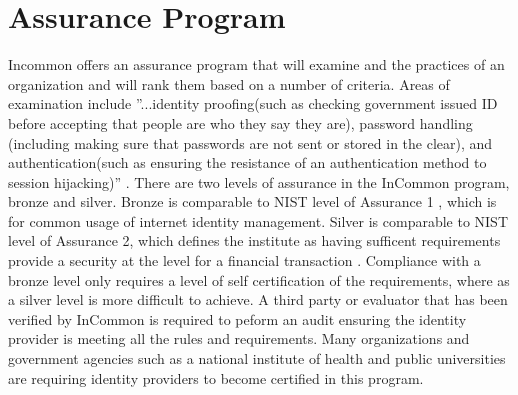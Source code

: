 \documentclass[9pt,twocolumn,twoside]{../../styles/osajnl}
\begin{document}

\section{Assurance Program}

Incommon offers an assurance program that will examine and the
practices of an organization and will rank them based on a number of
criteria.  Areas of examination include ''...identity proofing(such as
checking government issued ID before accepting that people are who
they say they are), password handling (including making sure that
passwords are not sent or stored in the clear), and
authentication(such as ensuring the resistance of an authentication
method to session hijacking)'' \cite{www-harvard}.  There are two
levels of assurance in the InCommon program, bronze and silver.
Bronze is comparable to NIST level of Assurance 1 , which is for common
usage of internet identity management.  Silver is comparable to NIST
level of Assurance 2, which defines the institute as having sufficent
requirements provide a security at the level for a financial
transaction \cite{www-levels}.  Compliance with a bronze level only
requires a level of self certification of the requirements, where as a
silver level is more difficult to achieve.  A third party or evaluator
that has been verified by InCommon is required to peform an audit
ensuring the identity provider is meeting all the rules and
requirements.  Many organizations and government agencies such as a
national institute of health and public universities are requiring
identity providers to become certified in this program.

\end{document}
